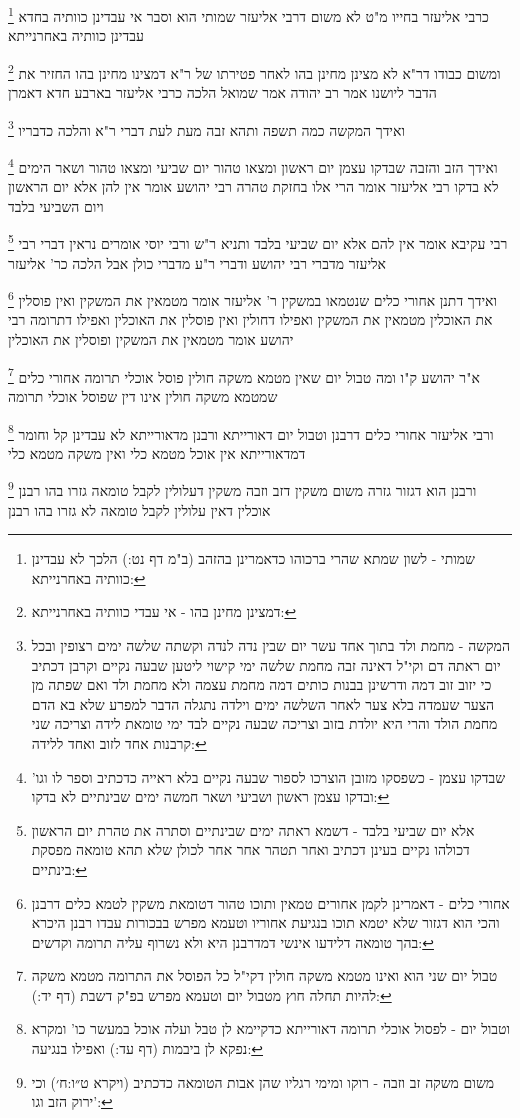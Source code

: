 \documentclass[12pt, openany]{book}
\newcommand{\footnotecomment}[1]{
	\renewcommand\thefootnote{}
	\footnote{#1}}
\newcommand{\commenta}[1]{\footnotecomment{#1}}
\begin{document}
{{\commenta{שמותי - לשון שמתא שהרי ברכוהו כדאמרינן בהזהב (ב"מ דף נט:) הלכך לא עבדינן כוותיה באחרנייתא:}
כרבי אליעזר בחייו מ"ט לא משום דרבי אליעזר שמותי הוא וסבר אי עבדינן כוותיה בחדא עבדינן כוותיה באחרנייתא
\commenta{דמצינן מחינן בהו - אי עבדי כוותיה באחרנייתא:}
ומשום כבודו דר"א לא מצינן מחינן בהו לאחר פטירתו של ר"א דמצינו מחינן בהו החזיר את הדבר ליושנו 
אמר רב יהודה אמר שמואל הלכה כרבי אליעזר בארבע חדא דאמרן 
\commenta{המקשה - מחמת ולד בתוך אחד עשר יום שבין נדה לנדה וקשתה שלשה ימים רצופין ובכל יום ראתה דם וקי"ל דאינה זבה מחמת שלשה ימי קישוי ליטען שבעה נקיים וקרבן דכתיב כי יזוב זוב דמה ודרשינן בבנות כותים דמה מחמת עצמה ולא מחמת ולד ואם שפתה מן הצער שעמדה בלא צער לאחר השלשה ימים וילדה נתגלה הדבר למפרע שלא בא הדם מחמת הולד והרי היא יולדת בזוב וצריכה שבעה נקיים לבד ימי טומאת לידה וצריכה שני קרבנות אחד לזוב ואחד ללידה:}
ואידך המקשה כמה תשפה ותהא זבה מעת לעת דברי ר"א והלכה כדבריו 
\commenta{שבדקו עצמן - כשפסקו מזובן הוצרכו לספור שבעה נקיים בלא ראייה כדכתיב וספר לו וגו' ובדקו עצמן ראשון ושביעי ושאר חמשה ימים שבינתיים לא בדקו:}
ואידך הזב והזבה שבדקו עצמן יום ראשון ומצאו טהור יום שביעי ומצאו טהור ושאר הימים לא בדקו רבי אליעזר אומר הרי אלו בחזקת טהרה רבי יהושע אומר אין להן אלא יום הראשון ויום השביעי בלבד 
\commenta{אלא יום שביעי בלבד - דשמא ראתה ימים שבינתיים וסתרה את טהרת יום הראשון דכולהו נקיים בעינן דכתיב ואחר תטהר אחר אחר לכולן שלא תהא טומאה מפסקת בינתיים:}
רבי עקיבא אומר אין להם אלא יום שביעי בלבד ותניא ר"ש ורבי יוסי אומרים נראין דברי רבי אליעזר מדברי רבי יהושע ודברי ר"ע מדברי כולן אבל הלכה כר' אליעזר 
\commenta{אחורי כלים - דאמרינן לקמן אחורים טמאין ותוכו טהור דטומאת משקין לטמא כלים דרבנן והכי הוא דגזור שלא יטמא תוכו בנגיעת אחוריו וטעמא מפרש בבכורות עבדו רבנן היכרא בהך טומאה דלידעו אינשי דמדרבנן היא ולא נשרוף עליה תרומה וקדשים:}
ואידך דתנן אחורי כלים שנטמאו במשקין ר' אליעזר אומר מטמאין את המשקין ואין פוסלין את האוכלין מטמאין את המשקין ואפילו דחולין ואין פוסלין את האוכלין ואפילו דתרומה רבי יהושע אומר מטמאין את המשקין ופוסלין את האוכלין 
\commenta{טבול יום שני הוא ואינו מטמא משקה חולין דקי"ל כל הפוסל את התרומה מטמא משקה להיות תחלה חוץ מטבול יום וטעמא מפרש בפ"ק דשבת (דף יד:):}
א"ר יהושע ק"ו ומה טבול יום שאין מטמא משקה חולין פוסל אוכלי תרומה אחורי כלים שמטמא משקה חולין אינו דין שפוסל אוכלי תרומה 
\commenta{וטבול יום - לפסול אוכלי תרומה דאורייתא כדקיימא לן טבל ועלה אוכל במעשר כו' ומקרא נפקא לן ביבמות (דף עד:) ואפילו בנגיעה:}
ורבי אליעזר אחורי כלים דרבנן וטבול יום דאורייתא ורבנן מדאורייתא לא עבדינן קל וחומר דמדאורייתא אין אוכל מטמא כלי ואין משקה מטמא כלי
\commenta{משום משקה זב וזבה - רוקו ומימי רגליו שהן אבות הטומאה כדכתיב (ויקרא ט״ו:ח׳) וכי ירוק הזב וגו':}
ורבנן הוא דגזור גזרה משום משקין דזב וזבה משקין דעלולין לקבל טומאה גזרו בהו רבנן אוכלין דאין עלולין לקבל טומאה לא גזרו בהו רבנן 
}}
\end{document}
